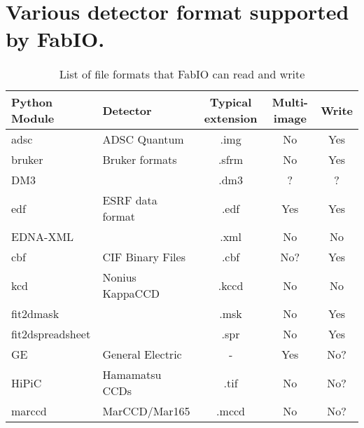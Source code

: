 \documentclass[preprint ]{iucr}
\begin{document}




\appendix
\section{Various detector format supported by FabIO.}
\onecolumn
\begin{table}[h]

\caption{\label{format}List of file formats that FabIO can read and write}
\vspace{1mm}
\begin{center}
\begin{tabular}{llccc}
Python Module   & Detector		& Typical extension & Multi-image	& Write\\%
\hline %
adsc	   &   ADSC Quantum		&	.img	&	No	&	Yes		\\%
bruker		&   Bruker formats		&	.sfrm	&	No	&	Yes		\\%
DM3			&						&	.dm3	&	?	&	?		\\%
edf		    &   ESRF data format	&	.edf	&	Yes	&	Yes		\\%
EDNA-XML \cite{edna}	& &	.xml	&	No		&	No	 \\%
cbf		    &   CIF Binary Files	&	.cbf	&	No?	& 	Yes		\\%
kcd	    	&   Nonius 	KappaCCD	&	.kccd	&	No 	&	No		\\%
fit2dmask \cite{fit2d} 	&			&   .msk    &   No  &   Yes  \\
fit2dspreadsheet \cite{fit2d}	&  	&  .spr    &   No  &   Yes    \\
GE		    &   General Electric	&	-		&	Yes	&	No?		\\%
HiPiC       & Hamamatsu CCDs 		&	.tif	&	No	&	No?	 	\\%
marccd		&   MarCCD/Mar165		&	.mccd	&	No	&	No?		\\%

\end{tabular}
\end{center}
\end{table}
\end{document}
